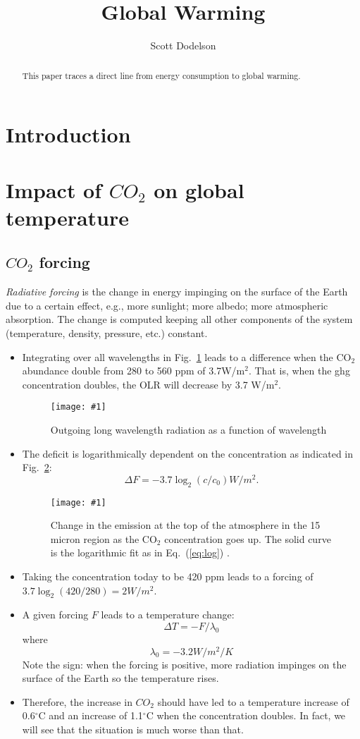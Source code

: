 \documentclass[tsecnumarabic,amssymb, nobibnotes, aps, prd]{revtex4-2}
\def\be{\begin{equation}}
\def\ee{\end{equation}}
\newcommand{\ec}[1]{Eq.~(\ref{eq:#1})}
\newcommand{\eql}[1]{\label{eq:#1}}
\newcommand{\sfig}[2]{
\texttt{[image: \#1]}
        }
\newcommand{\Spng}[2]{
   \begin{figure}[thbp]
   \begin{center}
    \sfig{Figures/#1.png}{0.8\columnwidth}
    \caption{{\small #2}}
    \label{fig:#1}
     \end{center}
   \end{figure}
}
\newcommand{\rf}[1]{\ref{fig:#1}}
\newcommand\bei{\begin{itemize}}
\newcommand\eei{\end{itemize}}
\begin{document}
\title{Global Warming}
\author{Scott Dodelson}
\begin{abstract}
This paper traces a direct line from energy consumption to global warming.
\end{abstract}

\maketitle

\section{Introduction}

\section{Impact of $CO_2$ on global temperature}

\subsection{$CO_2$ forcing}
 {\it Radiative forcing} is the change in energy impinging on the surface of the Earth due to a certain effect, e.g., more sunlight; more albedo; more atmospheric absorption. The change is computed keeping all other components of the system (temperature, density, pressure, etc.) constant.  
\bei
\item Integrating over all wavelengths in Fig.~\rf{olr} leads to a difference when the CO$_2$ abundance double from 280 to 560 ppm of 3.7W/m$^2$. That is, when the ghg concentration doubles, the OLR will decrease by 3.7 W/m$^2$. 
\Spng{olr}{Outgoing long wavelength radiation as a function of wavelength}
\item The deficit is logarithmically dependent on the concentration as indicated in Fig.~\rf{olrlog}:
\be
\Delta F = -3.7\log_2(c/c_0) W/m^2.\eql{log}\ee 
\Spng{olrlog}{Change in the emission at the top of the atmosphere in the 15 micron region as the CO$_2$ concentration goes up. The solid curve is the logarithmic fit as in \ec{log} .}
\item Taking the concentration today to be 420 ppm leads to a forcing of $3.7\log_2(420/280)=2 W/m^2$. 
\item A given forcing $F$ leads to a temperature change:
\be
\Delta T = -F/\lambda_0
\ee
where
\be
\lambda_0=-3.2 W/m^2/K\eql{lambda}\ee
Note the sign: when the forcing is positive, more radiation impinges on the surface of the Earth so the temperature rises.
\item Therefore, the increase in $CO_2$ should have led to a temperature increase of 0.6$^\circ$C and an increase of 1.1$^\circ$C when the concentration doubles. In fact, we will see that the situation is much worse than that.
\eei
\end{document}
